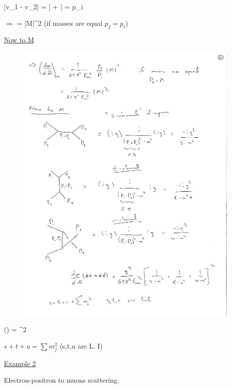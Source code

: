{\be
|v_1 - v_2| = \left|   +  \right| = p_i 
\ee


$\Rightarrow$
\be
{} =    |M|^2
\ee
(if masses are equal $p_f = p_i$)

\clearpage
\underline{Now to M}

\begin{figure}[h]
\centering
\includegraphics[width=0.99\textwidth]{./STUDiagrams.pdf}
\end{figure}

\be
{}(\phi\phi\rightarrow\phi\phi) =  ^2
\ee


$s+t+u = \sum m_j^2$  (s,t,u are L. I)

\clearpage

\underline{Example 2} 

Electron-positron to muons scattering.

}
